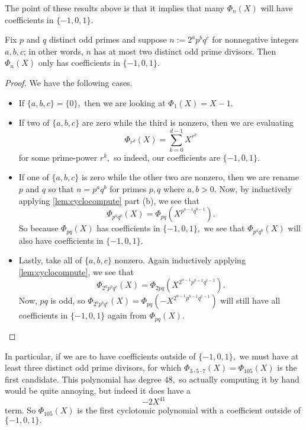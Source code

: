 \documentclass[../notes.tex]{subfiles}
\begin{document}
The point of these results above is that it implies that many $\Phi_n(X)$ will have coefficients in $\{-1,0,1\}.$
\begin{exe}
	Fix $p$ and $q$ distinct odd primes and suppose $n:=2^ap^bq^c$ for nonnegative integers $a,b,c$; in other words, $n$ has at most two distinct odd prime divisors. Then $\Phi_n(X)$ only has coefficients in $\{-1,0,1\}.$
\end{exe}
\begin{proof}
	We have the following cases.
	\begin{itemize}
		\item If $\{a,b,c\}=\{0\},$ then we are looking at $\Phi_1(X)=X-1.$
		\item If two of $\{a,b,c\}$ are zero while the third is nonzero, then we are evaluating
		\[\Phi_{r^d}(X)=\sum_{k=0}^{d-1}X^{r^k}\]
		for some prime-power $r^k,$ so indeed, our coefficients are $\{-1,0,1\}.$
		\item If one of $\{a,b,c\}$ is zero while the other two are nonzero, then we are rename $p$ and $q$ so that $n=p^aq^b$ for primes $p,q$ where $a,b>0.$ Now, by inductively applying \autoref{lem:cyclocompute} part (b), we see that
		\[\Phi_{p^aq^b}(X)=\Phi_{pq}\left(X^{p^{a-1}q^{b-1}}\right).\]
		So because $\Phi_{pq}(X)$ has coefficients in $\{-1,0,1\},$ we see that $\Phi_{p^aq^b}(X)$ will also have coefficients in $\{-1,0,1\}.$
		\item Lastly, take all of $\{a,b,c\}$ nonzero. Again inductively applying \autoref{lem:cyclocompute}, we see that
		\[\Phi_{2^ap^bq^c}(X)=\Phi_{2pq}\left(X^{2^{a-1}p^{b-1}q^{c-1}}\right).\]
		Now, $pq$ is odd, so $\Phi_{2^ap^bq^c}(X)=\Phi_{pq}\left(-X^{2^{a-1}p^{b-1}q^{c-1}}\right)$ will still have all coefficients in $\{-1,0,1\}$ again from $\Phi_{pq}(X).$
		\qedhere
	\end{itemize}
\end{proof}
In particular, if we are to have coefficients outside of $\{-1,0,1\},$ we must have at least three distinct odd prime divisors, for which $\Phi_{3\cdot5\cdot7}(X)=\Phi_{105}(X)$ is the first candidate. This polynomial has degree $48,$ so actually computing it by hand would be quite annoying, but indeed it does have a
\[-2X^{41}\]
term. So $\boxed{\Phi_{105}(X)}$ is the first cyclotomic polynomial with a coefficient outside of $\{-1,0,1\}.$
\end{document}
